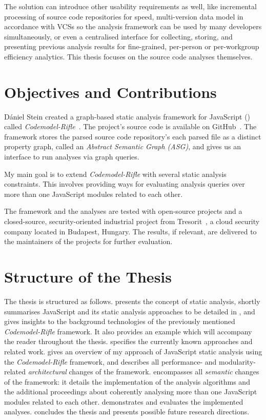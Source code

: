 The solution can introduce other usability requirements as well, like incremental processing of source code repositories for speed, multi-version data model in accordance with VCSs so the analysis framework can be used by many developers simultaneously, or even a centralised interface for collecting, storing, and presenting previous analysis results for fine-grained, per-person or per-workgroup efficiency analytics. This thesis focuses on the source code analyses themselves.


\section{Objectives and Contributions}

Dániel Stein created a graph-based static analysis framework for JavaScript (\es) called \emph{Codemodel-Rifle}~\cite{stein-daniel-msc}. The project's source code is available on GitHub~\cite{codemodel-rifle-github}. The framework stores the parsed source code repository's each parsed file as a distinct property graph, called an \emph{Abstract Semantic Graph (ASG)}, and gives us an interface to run analyses via graph queries.

My main goal is to extend \emph{Codemodel-Rifle} with several static analysis constraints. This involves providing ways for evaluating analysis queries over more than one JavaScript modules related to each other.

The framework and the analyses are tested with open-source projects and a closed-source, security-oriented industrial project from Tresorit~\cite{tresorit}, a cloud security company located in Budapest, Hungary. The results, if relevant, are delivered to the maintainers of the projects for further evaluation.


\section{Structure of the Thesis}

The thesis is structured as follows. \emph{} presents the concept of static analysis, shortly summarises JavaScript and its static analysis approaches to be detailed in , and gives insights to the background technologies of the previously mentioned \emph{Codemodel-Rifle} framework. It also provides an example which will accompany the reader throughout the thesis. \emph{} specifies the currently known approaches and related work. \emph{} gives an overview of my approach of JavaScript static analysis using the \emph{Codemodel-Rifle} framework, and describes all performance- and modularity-related \emph{architectural} changes of the framework. \emph{} encompasses all \emph{semantic} changes of the framework: it details the implementation of the analysis algorithms and the additional proceedings about coherently analysing more than one JavaScript modules related to each other. \emph{} demonstrates and evaluates the implemented analyses. \emph{} concludes the thesis and presents possible future research directions.

